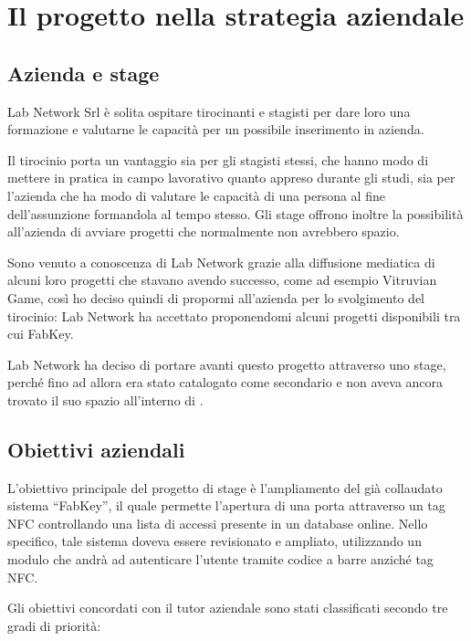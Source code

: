 
\chapter{Il progetto nella strategia aziendale}
\label{cap:processi-metodologie}

\section{Azienda e stage}
Lab Network Srl è solita ospitare tirocinanti e stagisti per dare loro una formazione e valutarne le capacità per un possibile inserimento in azienda.

Il tirocinio porta un vantaggio sia per gli stagisti stessi, che hanno modo di mettere in pratica in campo lavorativo quanto appreso durante gli studi, sia per l'azienda che ha modo di valutare le capacità di una persona al fine dell'assunzione formandola al tempo stesso. Gli stage offrono inoltre la possibilità all'azienda di avviare progetti che normalmente non avrebbero spazio. 

Sono venuto a conoscenza di Lab Network grazie alla diffusione mediatica di alcuni loro progetti che stavano avendo successo, come ad esempio Vitruvian Game, così ho deciso quindi di propormi all'azienda per lo svolgimento del tirocinio: Lab Network ha accettato proponendomi alcuni progetti disponibili tra cui FabKey.

Lab Network ha deciso di portare avanti questo progetto attraverso uno stage, perché fino ad allora era stato catalogato come secondario e non aveva ancora trovato il suo spazio all'interno di \lab{}.

\section{Obiettivi aziendali}
L'obiettivo principale del progetto di stage è l'ampliamento del già collaudato sistema ``FabKey'', il quale permette l'apertura di una porta attraverso un tag NFC controllando una lista di accessi presente in un database online. Nello specifico, tale sistema doveva essere revisionato e ampliato, utilizzando un modulo che andrà ad autenticare l'utente tramite codice a barre anziché tag NFC.

Gli obiettivi concordati con il tutor aziendale sono stati classificati secondo tre gradi di priorità:

